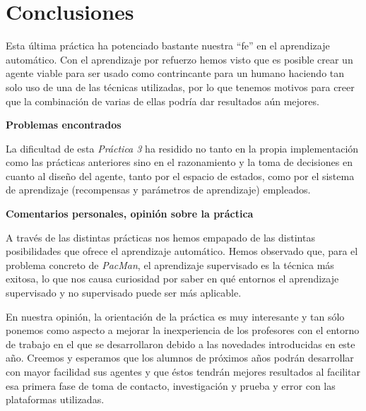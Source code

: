 \documentclass[12pt]{article}
\begin{document}
\newpage
\section{Conclusiones}


Esta última práctica ha potenciado bastante nuestra ``fe'' en el aprendizaje automático. Con el aprendizaje por refuerzo hemos visto que es posible crear un agente viable para ser usado como contrincante para un humano haciendo tan solo uso de una de las técnicas utilizadas, por lo que tenemos motivos para creer que la combinación de varias de ellas podría dar resultados aún mejores.

\vspace{0.5cm}
\centerline{\textbf{Problemas encontrados}}
\vspace{0.5cm}

La dificultad de esta \textit{Práctica 3} ha residido no tanto en la propia implementación como las prácticas anteriores sino en el razonamiento y la toma de decisiones en cuanto al diseño del agente, tanto por el espacio de estados, como por el sistema de aprendizaje (recompensas y parámetros de aprendizaje) empleados.

\vspace{0.5cm}
\centerline{\textbf{Comentarios personales, opinión sobre la práctica}}
\vspace{0.5cm}

A través de las distintas prácticas nos hemos empapado de las distintas posibilidades que ofrece el aprendizaje automático. Hemos observado que, para el problema concreto de \textit{PacMan}, el aprendizaje supervisado es la técnica más exitosa, lo que nos causa curiosidad por saber en qué entornos el aprendizaje supervisado y no supervisado puede ser más aplicable.

En nuestra opinión, la orientación de la práctica es muy interesante y tan sólo ponemos como aspecto a mejorar la inexperiencia de los profesores con el entorno de trabajo en el que se desarrollaron debido a las novedades introducidas en este año. Creemos y esperamos que los alumnos de próximos años podrán desarrollar con mayor facilidad sus agentes y que éstos tendrán mejores resultados al facilitar esa primera fase de toma de contacto, investigación y prueba y error con las plataformas utilizadas.
\end{document}
